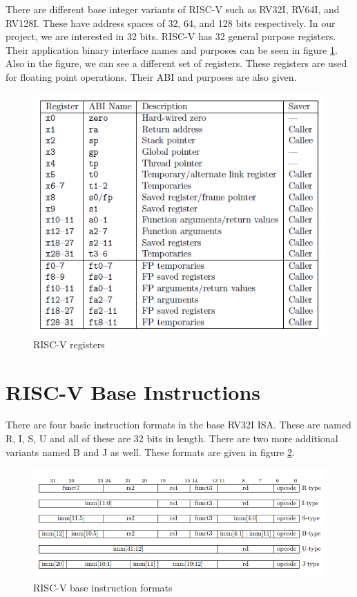 There are different base integer variants of RISC-V such as RV32I, RV64I, and RV128I. These have address spaces of 32, 64, and 128 bits respectively. \cite{Altinayozlem} In our project, we are interested in 32 bits. RISC-V has 32 general purpose registers. Their application binary interface names and purposes can be seen in figure \ref{fig:riscv_registers}. Also in the figure, we can see a different set of registers. These registers are used for floating point operations. Their ABI and purposes are also given.

\begin{figure}
    \centering
    \includegraphics{riscv/riscv_registers.png}
    \caption{RISC-V registers \cite{rvregisters}}
    \label{fig:riscv_registers}
\end{figure}

\section{RISC-V Base Instructions}
There are four basic instruction formats in the base RV32I ISA. These are named R, I, S, U and all of these are 32 bits in length. There are two more additional variants named B and J as well.\cite{rvmanual} These formats are given in figure \ref{fig:risc-v_base_instruction_formats}.
\begin{figure}
    \centering
    \includegraphics{riscv/riscv_base_instruction_formats.png}
    \caption{RISC-V base instruction formats \cite{rvmanual}}
    \label{fig:risc-v_base_instruction_formats}
\end{figure}

